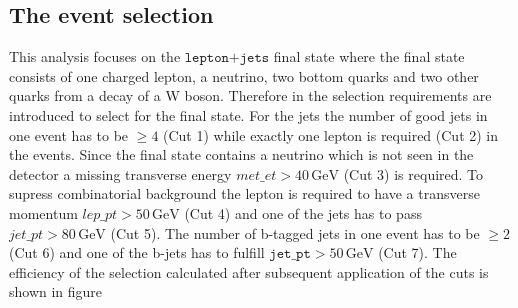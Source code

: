\subsection{The event selection}
This analysis focuses on the $\texttt{lepton+jets}$ final state where the final state consists of one charged lepton, a neutrino, two bottom quarks and two other quarks from a 
decay of a W boson. Therefore in the selection requirements are introduced to select for the final state. 
For the jets the number of good jets in one event has to be $\geq 4$ (Cut 1) while exactly one lepton is required (Cut 2) 
in the events. Since the final state contains a neutrino which is not seen in the detector a missing 
transverse energy $met\_et > 40 \, \si{\giga\eV}$ (Cut 3) is required. To supress combinatorial background 
the lepton is required to have a transverse momentum $lep\_pt > 50 \, \si{\giga\eV}$ (Cut 4) and one of 
the jets has to pass $jet\_pt > 80 \, \si{\giga\eV}$ (Cut 5). The number of b-tagged jets in one event has to be 
$\geq 2$ (Cut 6) and one of the b-jets has to fulfill $\texttt{jet\_pt} > 50 \, \si{\giga\eV}$ (Cut 7).
The efficiency of the selection calculated after subsequent application of the cuts is shown in figure 
